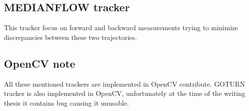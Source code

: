 \subsection{MEDIANFLOW tracker}
This tracker focus on forward and backward measurements trying to minimize
discrepancies between these two trajectories.

\subsection{OpenCV note}
All these mentioned trackers are implemented in OpenCV contribute. GOTURN
tracker is also implemented in OpenCV, unfortunately at the time of the writing
thesis it contains bug causing it unusable.


%
%
%
%
%
%
